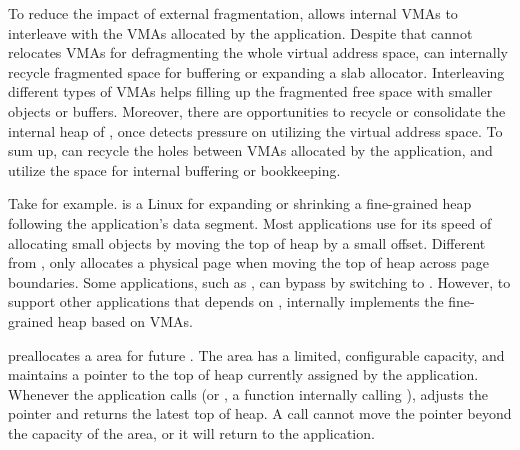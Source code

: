 To reduce the impact of external fragmentation, \thelibos{} allows internal VMAs to interleave with the VMAs allocated by the application.
Despite that \thelibos{} cannot relocates VMAs
for defragmenting the whole virtual address space,
\thelibos{} can internally recycle fragmented space for buffering or expanding a slab allocator.
Interleaving different types of VMAs
helps filling up the fragmented free space
with smaller objects or buffers.
Moreover, there are opportunities to recycle or consolidate the internal heap of \thelibos{},
once \thelibos{} detects pressure on utilizing the virtual address space.
To sum up, \thelibos{} can recycle the holes between VMAs allocated by the application, and utilize the space for internal buffering or bookkeeping.









Take  for example.
 is a Linux \linuxapi{} for expanding or shrinking a fine-grained heap following the application's data segment.
Most applications 
use  
for its speed of allocating 
small objects by moving the top of heap by a small offset.
Different from ,
 only allocates a physical page
when moving the top of heap across page boundaries.
Some applications, such as \gcc{}, can bypass  by switching to .
However, to support other applications that depends on ,
\thelibos{} internally implements the fine-grained heap
based on VMAs.



\thelibos{} preallocates a  area for future  \linuxapis{}.
The  area has a limited, configurable capacity,
and maintains a  pointer to the top of heap currently assigned by the application.
Whenever the application calls  (or , a \libc{} function internally calling ),
\thelibos{} adjusts the  pointer
and returns the latest top of heap.
A  call cannot move the  pointer beyond the capacity of the  area,
or it will return  to the application.



